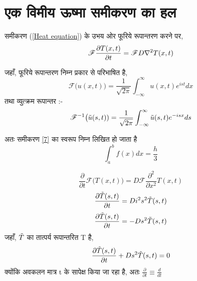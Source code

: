 \documentclass[10pt,a4paper,twoside]{article}
\begin{document}
 \pagebreak

\section{एक विमीय ऊष्मा समीकरण का हल}

समीकरण (\ref{Heat equation}) के उभय ओर फूरिये रूपान्तरण करने पर, 
\begin{equation}
    \mathscr{\huge F} {\frac{\partial T(x,t)}{\partial t}} = \mathscr{\huge F} {D \nabla ^2 T(x,t)}
\end{equation} \label{7}

जहाँ, फूरिये रूपान्तरण निम्न प्रकार से परिभाषित है,
\begin{equation}
    \mathscr{F} \big(u(x,t)) = \frac{1}{\sqrt{2\pi}} \int_{-\infty}^{\infty} u(x,t) e^{ist} dx %
\end{equation}
तथा व्युत्क्रम रूपान्तर :-
\begin{equation}
    \mathscr{F}^{-1} \big(\Tilde{u}(s,t)) = \frac{1}{\sqrt{2\pi}} \int_{-\infty}^{\infty} \Tilde{u}(s,t) e^{-isx} ds 
\end{equation}

अतः समीकरण \ref{7} का स्वरूप निम्न लिखित हो जाता है 
\begin{equation}
    \int_{a}^{b} f(x) dx = \frac{h}{3}
\end{equation}

\begin{equation} 
    \frac{\partial}{\partial t} {\mathscr{F}} \big(T(x,t)) = D \mathscr{F} {\frac{\partial^2}{\partial x^2}}{T(x,t)}
\end{equation}
\begin{equation}
    \frac{\partial \Tilde{T} (s,t)}{\partial t} = D i^2 s^2 \Tilde{T}(s,t)
\end{equation}
\begin{equation}
    \frac{\partial \Tilde{T} (s,t)}{\partial t} = - D s^2 \Tilde{T}(s,t)
\end{equation}
जहाँ, $\Tilde{T}$ का तात्पर्य रूपान्तरित T है,
\begin{equation}
    \frac{\partial \Tilde{T} (s,t)}{\partial t} + D s^2 \Tilde{T}(s,t) = 0
\end{equation}
क्योंकि अवकलन मात्र t के सापेक्ष किया जा रहा है, अतः
$\frac{\partial}{\partial t} \equiv \frac{d}{dt}$ 
\end{document}
